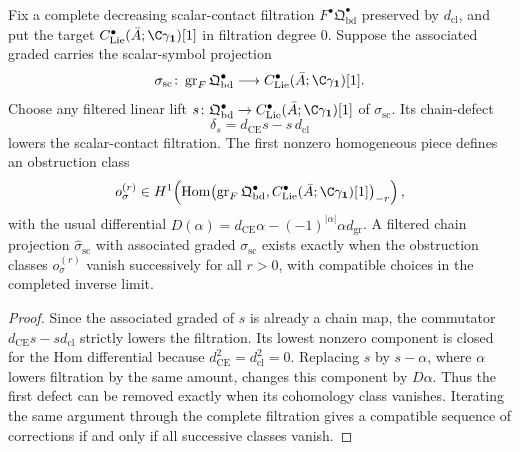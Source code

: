 \begin{lem}\label{lem:filtered-scalar-projection-obstruction}
  Fix a complete decreasing scalar-contact filtration
  \(F^\bullet\mathfrak Q^\bullet_{\mathrm{bd}}\) preserved by
  \(d_{\mathrm{cl}}\), and put the target
  \(C^\bullet_{\mathrm{Lie}}(\bar A;\C\gamma_{\mathbf 1})[1]\) in
  filtration degree \(0\).  Suppose the associated graded carries the
  scalar-symbol projection
  \[
    \sigma_{\mathrm{sc}}\colon
    \operatorname{gr}_{F}\mathfrak Q^\bullet_{\mathrm{bd}}
    \longrightarrow
    C^\bullet_{\mathrm{Lie}}(\bar A;\C\gamma_{\mathbf 1})[1].
  \]
  Choose any filtered linear lift
  \(s\colon\mathfrak Q^\bullet_{\mathrm{bd}}\to
  C^\bullet_{\mathrm{Lie}}(\bar A;\C\gamma_{\mathbf 1})[1]\) of
  \(\sigma_{\mathrm{sc}}\).  Its chain-defect
  \[
    \delta_s=d_{\mathrm{CE}}s-s\,d_{\mathrm{cl}}
  \]
  lowers the scalar-contact filtration.  The first nonzero homogeneous
  piece defines an obstruction class
  \[
    o_\sigma^{(r)}\in
    H^1\!\left(
      \operatorname{Hom}\bigl(\operatorname{gr}_{F}\mathfrak Q^\bullet_{\mathrm{bd}},
      C^\bullet_{\mathrm{Lie}}(\bar A;\C\gamma_{\mathbf 1})[1]\bigr)_{-r}
    \right),
  \]
  with the usual differential
  \(D(\alpha)=d_{\mathrm{CE}}\alpha-(-1)^{|\alpha|}\alpha d_{\operatorname{gr}}\).
  A filtered chain projection
  \(\widehat\sigma_{\mathrm{sc}}\) with associated graded
  \(\sigma_{\mathrm{sc}}\) exists exactly when the obstruction classes
  \(o_\sigma^{(r)}\) vanish successively for all \(r>0\), with compatible
  choices in the completed inverse limit.
\end{lem}

\begin{proof}
  Since the associated graded of \(s\) is already a chain map, the
  commutator \(d_{\mathrm{CE}}s-sd_{\mathrm{cl}}\) strictly lowers the
  filtration.  Its lowest nonzero component is closed for the Hom
  differential because
  \(d_{\mathrm{CE}}^2=d_{\mathrm{cl}}^2=0\).  Replacing \(s\) by
  \(s-\alpha\), where \(\alpha\) lowers filtration by the same amount,
  changes this component by \(D\alpha\).  Thus the first defect can be
  removed exactly when its cohomology class vanishes.  Iterating the same
  argument through the complete filtration gives a compatible sequence of
  corrections if and only if all successive classes vanish.
\end{proof}

